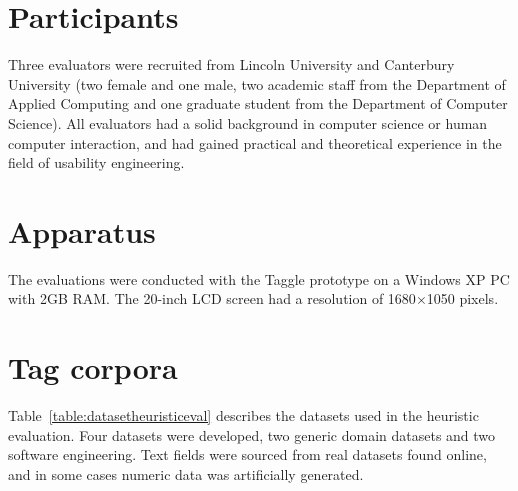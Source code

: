 \section{Participants}\label{sect:heuristicparticipants}
Three evaluators were recruited from Lincoln University and Canterbury University (two female and one male, two academic staff from the Department of Applied Computing and one graduate student from the Department of Computer Science). All evaluators had a solid background in computer science or human computer interaction, and had gained practical and theoretical experience in the field of usability engineering. 

\section{Apparatus}
The evaluations were conducted with the Taggle prototype on a Windows XP PC with 2GB RAM. The 20-inch LCD screen had a resolution of 1680$\times$1050 pixels.

\section{Tag corpora}

Table~\vref{table:datasetheuristiceval} describes the datasets used in the heuristic evaluation. Four datasets were developed, two generic domain datasets and two software engineering. Text fields were sourced from real datasets found online, and in some cases numeric data was artificially generated. 

